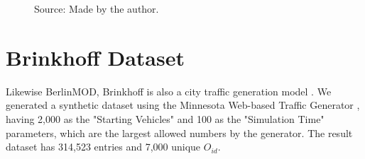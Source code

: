 {\begin{figure}[h!]
\begin{subfigure}[t]{0.48\textwidth}
        \label{fig:tdrive_disks}
    \end{subfigure}
    \footnotesize{Source: Made by the author.}
    \label{fig:tdrive_results2}
\end{figure}

\section{Brinkhoff Dataset}
\label{sec:brinkhoff}
Likewise BerlinMOD, Brinkhoff is also a city traffic generation model \cite{brinkhoffpaper}. We generated a synthetic
dataset using the Minnesota Web-based Traffic Generator \cite{mntg}, having 2,000 as the "Starting Vehicles" and 100 as
the "Simulation Time" parameters, which are the largest allowed numbers by the generator. The result dataset has 314,523
entries and 7,000 unique $O_{id}$.

}
